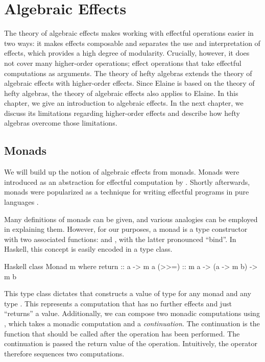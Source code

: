 \chapter{Algebraic Effects}\label{chap:algebraic_effects}

The theory of algebraic effects makes working with effectful operations easier in two ways: it makes effects composable and separates the use and interpretation of effects, which provides a high degree of modularity. Crucially, however, it does not cover many higher-order operations; effect operations that take effectful computations as arguments. The theory of hefty algebras extends the theory of algebraic effects with higher-order effects. Since Elaine is based on the theory of hefty algebras, the theory of algebraic effects also applies to Elaine. In this chapter, we give an introduction to algebraic effects. In the next chapter, we discuss its limitations regarding higher-order effects and describe how hefty algebras overcome those limitations.

\section{Monads}

We will build up the notion of algebraic effects from monads. Monads were introduced as an abstraction for effectful computation by \textcite{moggi_abstract_1989,moggi_computational_1989}. Shortly afterwards, monads were popularized as a technique for writing effectful programs in pure languages \autocite{wadler_essence_1992,peyton_jones_imperative_1993}.

Many definitions of monads can be given, and various analogies can be employed in explaining them. However, for our purposes, a monad is a type constructor with two associated functions:  and \hs{>>=}, with the latter pronounced ``bind''. In Haskell, this concept is easily encoded in a type class.

\begin{lst}{Haskell}
class Monad m where
  return :: a -> m a
  (>>=)  :: m a -> (a -> m b) -> m b
\end{lst}
%
This type class dictates that  constructs a value of type  for any monad  and any type . This represents a computation that has no further effects and just ``returns'' a value. Additionally, we can compose two monadic computations using \hs{>>=}, which takes a monadic computation and a \emph{continuation}. The continuation is the function that should be called after the operation has been performed. The continuation is passed the return value of the operation. Intuitively, the \hs{>>=} operator therefore sequences two computations.

